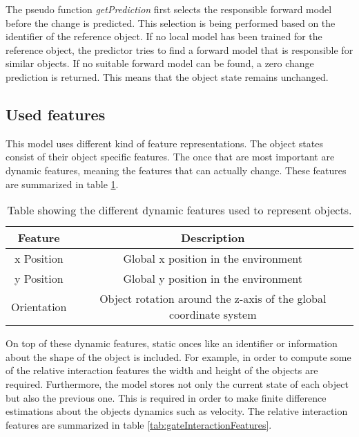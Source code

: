 The pseudo function \textit{getPrediction} first selects the responsible forward model before the change is predicted. This selection is being performed based on the identifier of the reference object. If no local model has been trained for the reference object, the predictor tries to find a forward model that is responsible for similar objects. If no suitable forward model can be found, a zero change prediction is returned. This means that the object state remains unchanged.


\subsection{Used features}

This model uses different kind of feature representations. The object states consist of their object specific features. The once that are most important are dynamic features, meaning the features that can actually change. These features are summarized in table \ref{tab:gateObjectFeatures}.

\begin{table}
	\centering
	\begin{tabular}{|c|c|}
		\hline Feature & Description \\ 
		\hline x Position & Global x position in the environment \\ 
		\hline y Position & Global y position in the environment \\ 
		\hline Orientation & Object rotation around the z-axis of the global coordinate system \\ 
		\hline 
	\end{tabular} 
	\caption{Table showing the different dynamic features used to represent objects.}
	\label{tab:gateObjectFeatures}
\end{table}

On top of these dynamic features, static onces like an identifier or information about the shape of the object is included. For example, in order to compute some of the relative interaction features the width and height of the objects are required. Furthermore, the model stores not only the current state of each object but also the previous one. This is required in order to make finite difference estimations about the objects dynamics such as velocity. 
The relative interaction features are summarized in table \ref{tab:gateInteractionFeatures}. 

